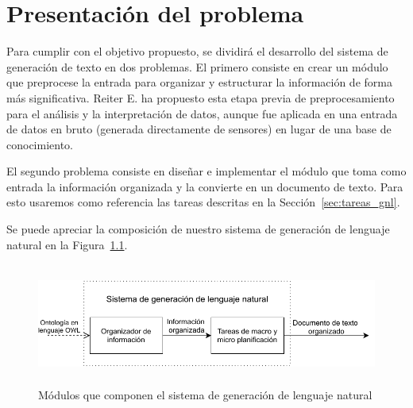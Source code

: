 \chapter{Presentación del problema}

Para cumplir con el objetivo propuesto, se dividirá el desarrollo del sistema de generación de texto en dos problemas. El primero consiste en crear un módulo que preprocese la entrada para organizar y estructurar la información de forma más significativa. Reiter E. ha propuesto esta etapa previa de preprocesamiento~\cite{reiter2007architecture} para el análisis y la interpretación de datos, aunque fue aplicada en una entrada de datos en bruto (generada directamente de sensores) en lugar de una base de conocimiento.

El segundo problema consiste en diseñar e implementar el módulo que toma como entrada la información organizada y la convierte en un documento de texto. Para esto usaremos como referencia las tareas descritas en la Sección~\ref{sec:tareas_gnl}.

Se puede apreciar la composición de nuestro sistema de generación de lenguaje natural en la Figura~\ref{fig:modulos_sgln}.

\begin{figure}
    \centering
    \includegraphics[width=12cm, height=4cm]{img/presentacion_problema/modulos_sgln.pdf}
    \caption{Módulos que componen el sistema de generación de lenguaje natural}
    \label{fig:modulos_sgln}
\end{figure}

